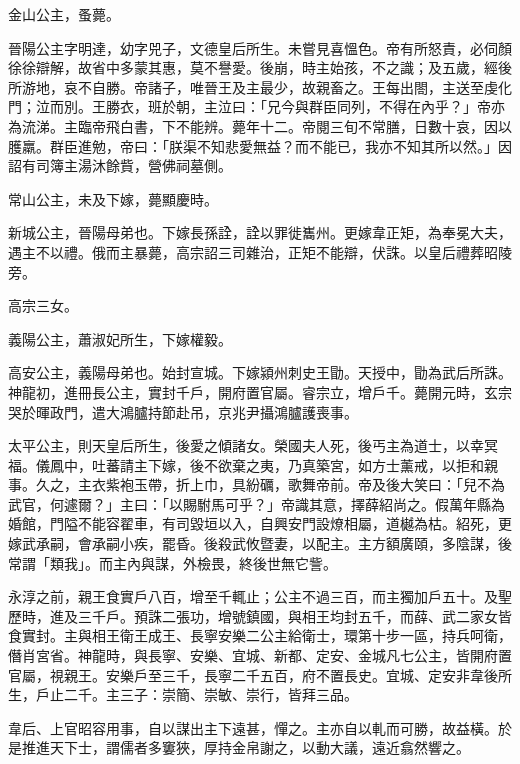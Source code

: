 \begin{pinyinscope}
 金山公主，蚤薨。



 晉陽公主字明達，幼字兕子，文德皇后所生。未嘗見喜慍色。帝有所怒責，必伺顏徐徐辯解，故省中多蒙其惠，莫不譽愛。後崩，時主始孩，不之識；及五歲，經後所游地，哀不自勝。帝諸子，唯晉王及主最少，故親畜之。王每出閤，主送至虔化門；泣而別。王勝衣，班於朝，主泣曰：「兄今與群臣同列，不得在內乎？」帝亦為流涕。主臨帝飛白書，下不能辨。薨年十二。帝閱三旬不常膳，日數十哀，因以臒羸。群臣進勉，帝曰：「朕渠不知悲愛無益？而不能已，我亦不知其所以然。」因詔有司簿主湯沐餘貲，營佛祠墓側。



 常山公主，未及下嫁，薨顯慶時。



 新城公主，晉陽母弟也。下嫁長孫詮，詮以罪徙巂州。更嫁韋正矩，為奉冕大夫，遇主不以禮。俄而主暴薨，高宗詔三司雜治，正矩不能辯，伏誅。以皇后禮葬昭陵旁。



 高宗三女。



 義陽公主，蕭淑妃所生，下嫁權毅。



 高安公主，義陽母弟也。始封宣城。下嫁潁州刺史王勖。天授中，勖為武后所誅。神龍初，進冊長公主，實封千戶，開府置官屬。睿宗立，增戶千。薨開元時，玄宗哭於暉政門，遣大鴻臚持節赴吊，京兆尹攝鴻臚護喪事。



 太平公主，則天皇后所生，後愛之傾諸女。榮國夫人死，後丐主為道士，以幸冥福。儀鳳中，吐蕃請主下嫁，後不欲棄之夷，乃真築宮，如方士薰戒，以拒和親事。久之，主衣紫袍玉帶，折上巾，具紛礪，歌舞帝前。帝及後大笑曰：「兒不為武官，何遽爾？」主曰：「以賜駙馬可乎？」帝識其意，擇薛紹尚之。假萬年縣為婚館，門隘不能容翟車，有司毀垣以入，自興安門設燎相屬，道樾為枯。紹死，更嫁武承嗣，會承嗣小疾，罷昏。後殺武攸暨妻，以配主。主方額廣頤，多陰謀，後常謂「類我」。而主內與謀，外檢畏，終後世無它訾。



 永淳之前，親王食實戶八百，增至千輒止；公主不過三百，而主獨加戶五十。及聖歷時，進及三千戶。預誅二張功，增號鎮國，與相王均封五千，而薛、武二家女皆食實封。主與相王衛王成王、長寧安樂二公主給衛士，環第十步一區，持兵呵衛，僭肖宮省。神龍時，與長寧、安樂、宜城、新都、定安、金城凡七公主，皆開府置官屬，視親王。安樂戶至三千，長寧二千五百，府不置長史。宜城、定安非韋後所生，戶止二千。主三子：崇簡、崇敏、崇行，皆拜三品。



 韋后、上官昭容用事，自以謀出主下遠甚，憚之。主亦自以軋而可勝，故益橫。於是推進天下士，謂儒者多窶狹，厚持金帛謝之，以動大議，遠近翕然響之。




\end{pinyinscope}
